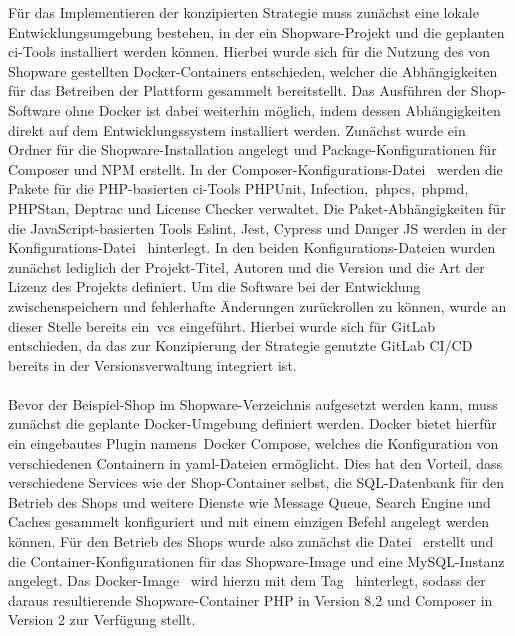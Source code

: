 Für das Implementieren der konzipierten Strategie muss zunächst eine lokale Entwicklungsumgebung bestehen, in der ein
Shopware-Projekt und die geplanten \acrshort{ci}-Tools installiert werden können.
Hierbei wurde sich für die Nutzung des von Shopware gestellten Docker-Containers entschieden, welcher die
Abhängigkeiten für das Betreiben der Plattform gesammelt bereitstellt.
Das Ausführen der Shop-Software ohne Docker ist dabei weiterhin möglich, indem dessen Abhängigkeiten direkt auf dem
Entwicklungssystem installiert werden.
Zunächst wurde ein Ordner für die Shopware-Installation angelegt und Package-Konfigurationen für Composer und NPM
erstellt.
In der Composer-Konfigurations-Datei\  werden die Pakete für die PHP-basierten
\acrshort{ci}-Tools PHPUnit, Infection,\ \acrshort{phpcs},\ \acrshort{phpmd}, PHPStan, Deptrac und License Checker
verwaltet.
Die Paket-Abhängigkeiten für die JavaScript-basierten Tools Eslint, Jest, Cypress und Danger JS werden in der
Konfigurations-Datei\  hinterlegt.
In den beiden Konfigurations-Dateien wurden zunächst lediglich der Projekt-Titel, Autoren und die Version und die Art
der Lizenz des Projekts definiert.
Um die Software bei der Entwicklung zwischenspeichern und fehlerhafte Änderungen zurückrollen zu können,
wurde an dieser Stelle bereits ein\ \acrshort{vcs} eingeführt.
Hierbei wurde sich für GitLab entschieden, da das zur Konzipierung der Strategie genutzte GitLab CI/CD bereits in der
Versionsverwaltung integriert ist.
\\\\
Bevor der Beispiel-Shop im Shopware-Verzeichnis aufgesetzt werden kann, muss zunächst die geplante Docker-Umgebung
definiert werden.
Docker bietet hierfür ein eingebautes Plugin namens\ \glqq Docker Compose\grqq, welches die Konfiguration von
verschiedenen Containern in \acrshort{yaml}-Dateien ermöglicht.
Dies hat den Vorteil, dass verschiedene Services wie der Shop-Container selbst, die SQL-Datenbank für den Betrieb des
Shops und weitere Dienste wie Message Queue, Search Engine und Caches gesammelt konfiguriert und mit einem einzigen
Befehl angelegt werden können.
Für den Betrieb des Shops wurde also zunächst die Datei\  erstellt und die
Container-Konfigurationen für das Shopware-Image und eine MySQL-Instanz angelegt.
Das Docker-Image\  wird hierzu mit dem Tag\  hinterlegt,
sodass der daraus resultierende Shopware-Container PHP in Version 8.2 und Composer in Version 2 zur Verfügung stellt.
